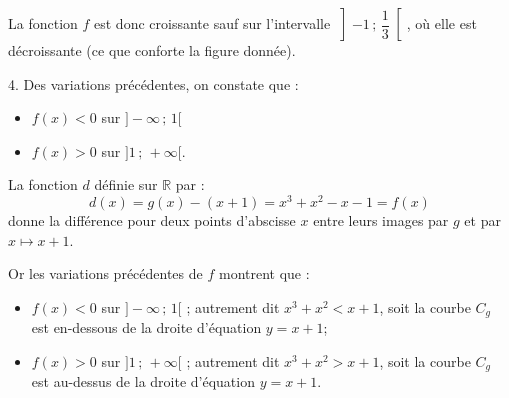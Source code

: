 \documentclass[10pt]{article}
\begin{document}
	
	La fonction \( f \) est donc croissante sauf sur l'intervalle \( \left] -1 \, ; \, \dfrac{1}{3} \right[ \), où elle est décroissante (ce que conforte la figure donnée).
	
	4. Des variations précédentes, on constate que :
	\begin{itemize}
		\item $f(x) < 0$ sur $ ]-\infty \,;\, 1[$ 
		\item $f(x) > 0$  sur $]1 \,;\, +\infty[$.
	\end{itemize}
	
	La fonction \(d\) définie sur \(\mathbb{R}\) par :
	\[
	d(x) = g(x) - (x + 1) = x^3 + x^2 - x - 1 = f(x)
	\]
	donne la différence pour deux points d'abscisse \(x\) entre leurs images par \(g\) et par \(x \mapsto x + 1\).
	
	Or les variations précédentes de \(f\) montrent que :
	\begin{itemize}[label=-]
		\item \(f(x) < 0\) sur \( ]-\infty \,;\, 1[ \) ; autrement dit \(x^3 + x^2 < x + 1\), soit la courbe \(C_g\) est en-dessous de la droite d'équation \(y = x + 1\);
		\item \(f(x) > 0\) sur \( ]1 \,;\, +\infty[ \) ; autrement dit \(x^3 + x^2 > x + 1\), soit la courbe \(C_g\) est au-dessus de la droite d'équation \(y = x + 1\).
	\end{itemize}
\end{document}
